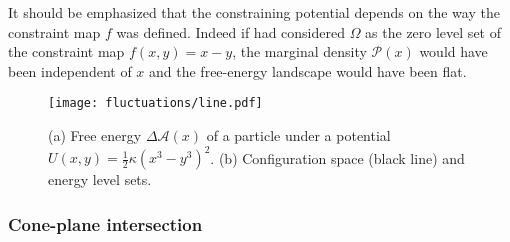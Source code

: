 \begin{subappendices}
It should be emphasized that the constraining potential depends on the way the constraint map $f$ was defined.
Indeed if had considered $\Omega$ as the zero level set of the constraint map $f(x, y) = x - y$, the marginal density $\mathscr{P}(x)$ would have been independent of $x$ and the free-energy landscape would have been flat.
%
\begin{figure}
  \begin{center}
    \texttt{[image: fluctuations/line.pdf]}
  \end{center}
  \caption{(a) Free energy $\Delta\mathscr{A}(x)$ of a particle under a potential $U(x,y) = \frac{1}{2}\kappa(x^{3}-y^{3})^{2}$. (b) Configuration space (black line) and energy level sets.}
  \label{fig:line}
\end{figure}

\subsubsection*{Cone-plane intersection}


\end{subappendices}
